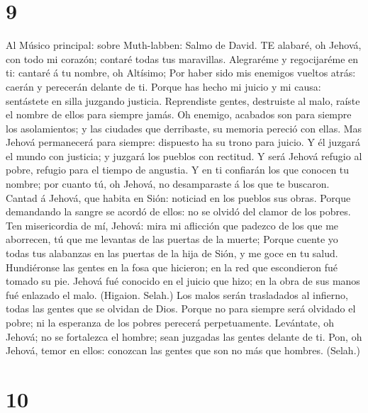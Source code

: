\hypertarget{section-8}{%
\section{9}\label{section-8}}

 Al Músico principal: sobre Muth-labben: Salmo de David. TE
alabaré, oh Jehová, con todo mi corazón; contaré todas tus maravillas.
 Alegraréme y regocijaréme en ti: cantaré á tu nombre, oh
Altísimo;  Por haber sido mis enemigos vueltos atrás: caerán
y perecerán delante de ti.  Porque has hecho mi juicio y mi
causa: sentástete en silla juzgando justicia.  Reprendiste
gentes, destruiste al malo, raíste el nombre de ellos para siempre
jamás.  Oh enemigo, acabados son para siempre los
asolamientos; y las ciudades que derribaste, su memoria pereció con
ellas.  Mas Jehová permanecerá para siempre: dispuesto ha su
trono para juicio.  Y él juzgará el mundo con justicia; y
juzgará los pueblos con rectitud.  Y será Jehová refugio al
pobre, refugio para el tiempo de angustia.  Y en ti
confiarán los que conocen tu nombre; por cuanto tú, oh Jehová, no
desamparaste á los que te buscaron.  Cantad á Jehová, que
habita en Sión: noticiad en los pueblos sus obras.  Porque
demandando la sangre se acordó de ellos: no se olvidó del clamor de los
pobres.  Ten misericordia de mí, Jehová: mira mi aflicción
que padezco de los que me aborrecen, tú que me levantas de las puertas
de la muerte;  Porque cuente yo todas tus alabanzas en las
puertas de la hija de Sión, y me goce en tu salud. 
Hundiéronse las gentes en la fosa que hicieron; en la red que
escondieron fué tomado su pie.  Jehová fué conocido en el
juicio que hizo; en la obra de sus manos fué enlazado el malo. (Higaion.
Selah.)  Los malos serán trasladados al infierno, todas las
gentes que se olvidan de Dios.  Porque no para siempre será
olvidado el pobre; ni la esperanza de los pobres perecerá perpetuamente.
 Levántate, oh Jehová; no se fortalezca el hombre; sean
juzgadas las gentes delante de ti.  Pon, oh Jehová, temor
en ellos: conozcan las gentes que son no más que hombres. (Selah.)

\hypertarget{section-9}{%
\section{10}\label{section-9}}

